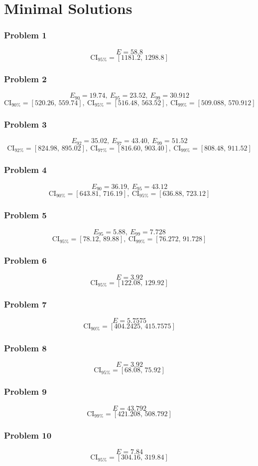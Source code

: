 \part{Minimal Solutions}
\section*{Problem 1}
\[
E=58.8
\]
\[
\text{CI}_{95\%}=[1181.2,\,1298.8]
\]

\section*{Problem 2}
\[
E_{90}=19.74,\ E_{95}=23.52,\ E_{99}=30.912
\]
\[
\text{CI}_{90\%}=[520.26,\,559.74],\ \text{CI}_{95\%}=[516.48,\,563.52],\ \text{CI}_{99\%}=[509.088,\,570.912]
\]

\section*{Problem 3}
\[
E_{92}=35.02,\ E_{97}=43.40,\ E_{99}=51.52
\]
\[
\text{CI}_{92\%}=[824.98,\,895.02],\ \text{CI}_{97\%}=[816.60,\,903.40],\ \text{CI}_{99\%}=[808.48,\,911.52]
\]

\section*{Problem 4}
\[
E_{90}=36.19,\ E_{95}=43.12
\]
\[
\text{CI}_{90\%}=[643.81,\,716.19],\ \text{CI}_{95\%}=[636.88,\,723.12]
\]

\section*{Problem 5}
\[
E_{95}=5.88,\ E_{99}=7.728
\]
\[
\text{CI}_{95\%}=[78.12,\,89.88],\ \text{CI}_{99\%}=[76.272,\,91.728]
\]

\section*{Problem 6}
\[
E=3.92
\]
\[
\text{CI}_{95\%}=[122.08,\,129.92]
\]

\section*{Problem 7}
\[
E=5.7575
\]
\[
\text{CI}_{90\%}=[404.2425,\,415.7575]
\]

\section*{Problem 8}
\[
E=3.92
\]
\[
\text{CI}_{95\%}=[68.08,\,75.92]
\]

\section*{Problem 9}
\[
E=43.792
\]
\[
\text{CI}_{99\%}=[421.208,\,508.792]
\]

\section*{Problem 10}
\[
E=7.84
\]
\[
\text{CI}_{95\%}=[304.16,\,319.84]
\]


